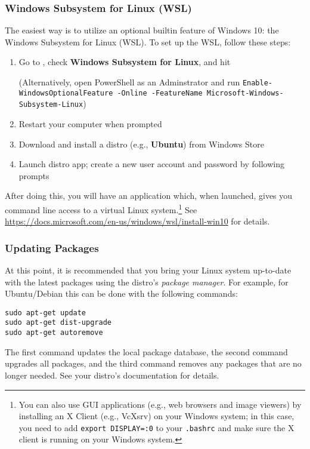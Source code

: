 \documentclass[12pt]{article}
\begin{document}
\subsubsection{Windows Subsystem for Linux (WSL)} \label{sec:wsl}
The easiest way is to utilize an optional builtin feature of Windows 10: the Windows Subsystem for Linux (WSL). To set up the WSL, follow these steps:
\begin{enumerate}
    \item Go to , check \textbf{Windows Subsystem for Linux}, and hit 

        (Alternatively, open PowerShell as an Adminstrator and run \texttt{Enable-WindowsOptionalFeature -Online -FeatureName Microsoft-Windows-Subsystem-Linux})
    \item Restart your computer when prompted
    \item Download and install a distro (e.g., \textbf{Ubuntu}) from Windows Store
    \item Launch distro app; create a new user account and password by following prompts
\end{enumerate}
After doing this, you will have an application which, when launched, gives you command line access to a virtual Linux system.\footnote{You can also use GUI applications (e.g., web browsers and image viewers) by installing an X Client (e.g., VcXsrv) on your Windows system; in this case, you need to add \texttt{export DISPLAY=:0} to your \texttt{.bashrc} and make sure the X client is running on your Windows system.} See \url{https://docs.microsoft.com/en-us/windows/wsl/install-win10} for details.

\subsubsection{Updating Packages}
At this point, it is recommended that you bring your Linux system up-to-date with the latest packages using the distro's \emph{package manager}. For example, for Ubuntu/Debian this can be done with the following commands:
\begin{verbatim}
sudo apt-get update
sudo apt-get dist-upgrade
sudo apt-get autoremove
\end{verbatim}
The first command updates the local package database, the second command upgrades all packages, and the third command removes any packages that are no longer needed. See your distro's documentation for details.
\end{document}
